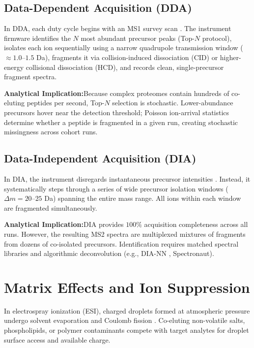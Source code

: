 \documentclass[11pt,twoside,openright]{book}
\begin{document}
\subsection{Data-Dependent Acquisition (DDA)}

In DDA, each duty cycle begins with an MS1 survey scan \cite{michalski2011more}. The instrument firmware identifies the $N$ most abundant precursor peaks (Top-$N$ protocol), isolates each ion sequentially using a narrow quadrupole transmission window ($\approx 1.0$--$1.5$ Da), fragments it via collision-induced dissociation (CID) or higher-energy collisional dissociation (HCD), and records clean, single-precursor fragment spectra.

\noindent\textbf{Analytical Implication:}\enspace Because complex proteomes contain hundreds of co-eluting peptides per second, Top-$N$ selection is stochastic. Lower-abundance precursors hover near the detection threshold; Poisson ion-arrival statistics determine whether a peptide is fragmented in a given run, creating stochastic missingness across cohort runs.

\subsection{Data-Independent Acquisition (DIA)}

In DIA, the instrument disregards instantaneous precursor intensities \cite{gillet2012targeted, venable2004automated}. Instead, it systematically steps through a series of wide precursor isolation windows ($\Delta m = 20$--$25$ Da) spanning the entire mass range. All ions within each window are fragmented simultaneously.

\noindent\textbf{Analytical Implication:}\enspace DIA provides $100\%$ acquisition completeness across all runs. However, the resulting MS2 spectra are multiplexed mixtures of fragments from dozens of co-isolated precursors. Identification requires matched spectral libraries and algorithmic deconvolution (e.g., DIA-NN \cite{demichev2020dia}, Spectronaut).

\section{Matrix Effects and Ion Suppression}
\label{sec:ion_suppression}

In electrospray ionization (ESI), charged droplets formed at atmospheric pressure undergo solvent evaporation and Coulomb fission \cite{fenn1989electrospray, king2000mechanisms}. Co-eluting non-volatile salts, phospholipids, or polymer contaminants compete with target analytes for droplet surface access and available charge.
\end{document}
